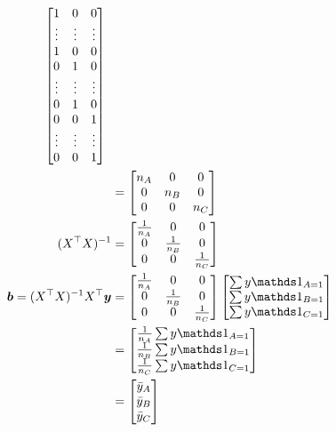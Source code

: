 \documentclass[12pt]{article}
\begin{document}
\begin{enumerate}
{\begin{align*}
\begin{array}{c c}
        \begin{bmatrix}
            1 & 0 & 0 \\
            \vdots & \vdots & \vdots \\
            1 & 0 & 0 \\
            0 & 1 & 0 \\
            \vdots & \vdots & \vdots \\
            0 & 1 & 0 \\
            0 & 0 & 1 \\
            \vdots & \vdots & \vdots \\
            0 & 0 & 1
        \end{bmatrix}
    \end{array} \\
    &= \begin{bmatrix}
        n_A & 0 & 0 \\
        0 & n_B & 0 \\
        0 & 0 & n_C
    \end{bmatrix} \\
    (X^\top X)^{-1} &= \begin{bmatrix}
        \oneover{n_A} & 0 & 0 \\
        0 & \oneover{n_B} & 0 \\
        0 & 0 & \oneover{n_C}
    \end{bmatrix} \\
    \vect{b} = (X^\top X)^{-1} X^\top \y &= \begin{bmatrix}
        \oneover{n_A} & 0 & 0 \\
        0 & \oneover{n_B} & 0 \\
        0 & 0 & \oneover{n_C}
    \end{bmatrix} \begin{bmatrix}
        \sum y \indic{A = 1} \\
        \sum y \indic{B = 1} \\
        \sum y \indic{C = 1}
    \end{bmatrix} \\
    &= \begin{bmatrix}
        \oneover{n_A} \sum y \indic{A = 1} \\
        \oneover{n_B} \sum y \indic{B = 1} \\
        \oneover{n_C} \sum y \indic{C = 1}
    \end{bmatrix} \\
    &= \begin{bmatrix}
        \ybar_A \\
        \ybar_B \\
        \ybar_C
    \end{bmatrix}
\end{align*}
}

\pagebreak

\end{enumerate}
\end{document}
